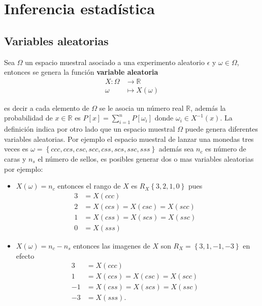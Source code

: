 \documentclass[10pt,]{krantz}
\providecommand{\tightlist}{%
  \setlength{\itemsep}{0pt}\setlength{\parskip}{0pt}}
\theoremstyle{definition}
\theoremstyle{definition}
\theoremstyle{definition}
\theoremstyle{remark}
\let\BeginKnitrBlock\begin \let\EndKnitrBlock\end
\begin{document}
\hypertarget{part-inferencia-estaduxedstica}{%
\part{Inferencia estadística}\label{part-inferencia-estaduxedstica}}

\hypertarget{variables-aleatorias}{%
\chapter{Variables aleatorias}\label{variables-aleatorias}}

\BeginKnitrBlock{definition}[Variable aleatoria]
\protect\hypertarget{def:unnamed-chunk-9}{}{\label{def:unnamed-chunk-9} \iffalse (Variable aleatoria) \fi{} }Sea \(\Omega\) un espacio muestral asociado a una experimento aleatorio \(\epsilon\) y \(\omega\in\Omega\), entonces se genera la función \textbf{variable aleatoria}
\begin{align*}
  X:\Omega&\longrightarrow \mathbb{R}\\
  \omega&\longmapsto X(\omega)
\end{align*}
\EndKnitrBlock{definition}

es decir a cada elemento de \(\Omega\) se le asocia un número real \(\mathbb{R}\), además la probabilidad de \(x\in \mathbb{R}\) es \(P[x]= \sum^{n}_{i=1}P\left[\omega_i\right]\) donde \(\omega_i\in X^{-1}(x)\). La definición indica por otro lado que un espacio muestral \(\Omega\) puede genera diferentes variables aleatorias. Por ejemplo el espacio muestral de lanzar una monedas tres veces es \(\omega= \left\{ccc,ccs,csc,scc,css,scs,ssc,sss\right\}\) además sea \(n_c\) es número de caras y \(n_s\) el número de sellos, es posibles generar dos o mas variables aleatorias por ejemplo:

\begin{itemize}
\tightlist
\item
  \(X(\omega)=n_c\) entonces el rango de \(X\) es \(R_X \left\{3,2,1,0\right\}\)
  pues \begin{align*}
  3&=X(ccc)&\\
  2&=X(ccs)=X(csc)=X(scc)&\\
  1&=X(css)=X(scs)=X(ssc)&\\
  0&=X(sss)&
  \end{align*}
\item
  \(X(\omega)=n_c-n_s\) entonces las imagenes de \(X\) son \(R_X= \left\{3,1,-1,-3\right\}\) en efecto
  \begin{align*}
  3&=X(ccc)&\\
  1&=X(ccs)=X(csc)=X(scc)&\\
  -1&=X(css)=X(scs)=X(ssc)&\\
  -3&=X(sss).&
  \end{align*}
\end{itemize}
\end{document}
